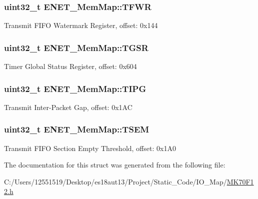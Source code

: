\subsubsection[{T\+F\+W\+R}]{\setlength{\rightskip}{0pt plus 5cm}uint32\+\_\+t E\+N\+E\+T\+\_\+\+Mem\+Map\+::\+T\+F\+W\+R}\label{struct_e_n_e_t___mem_map_aef8b194a94a2a24c0f705e65af5bee24}
Transmit F\+I\+F\+O Watermark Register, offset\+: 0x144 \hypertarget{struct_e_n_e_t___mem_map_af759f85ad62d7a7d8937391b0eb9f4d4}{}
\subsubsection[{T\+G\+S\+R}]{\setlength{\rightskip}{0pt plus 5cm}uint32\+\_\+t E\+N\+E\+T\+\_\+\+Mem\+Map\+::\+T\+G\+S\+R}\label{struct_e_n_e_t___mem_map_af759f85ad62d7a7d8937391b0eb9f4d4}
Timer Global Status Register, offset\+: 0x604 \hypertarget{struct_e_n_e_t___mem_map_a33c2b64aa493e8e381cd207ac9c6e8ec}{}
\subsubsection[{T\+I\+P\+G}]{\setlength{\rightskip}{0pt plus 5cm}uint32\+\_\+t E\+N\+E\+T\+\_\+\+Mem\+Map\+::\+T\+I\+P\+G}\label{struct_e_n_e_t___mem_map_a33c2b64aa493e8e381cd207ac9c6e8ec}
Transmit Inter-\/\+Packet Gap, offset\+: 0x1\+A\+C \hypertarget{struct_e_n_e_t___mem_map_a8cb50de4da08a100de4f82ddc5f4eb9e}{}
\subsubsection[{T\+S\+E\+M}]{\setlength{\rightskip}{0pt plus 5cm}uint32\+\_\+t E\+N\+E\+T\+\_\+\+Mem\+Map\+::\+T\+S\+E\+M}\label{struct_e_n_e_t___mem_map_a8cb50de4da08a100de4f82ddc5f4eb9e}
Transmit F\+I\+F\+O Section Empty Threshold, offset\+: 0x1\+A0 

The documentation for this struct was generated from the following file\+:\begin{DoxyCompactItemize}
\item 
C\+:/\+Users/12551519/\+Desktop/es18aut13/\+Project/\+Static\+\_\+\+Code/\+I\+O\+\_\+\+Map/\hyperlink{_m_k70_f12_8h}{M\+K70\+F12.\+h}\end{DoxyCompactItemize}
